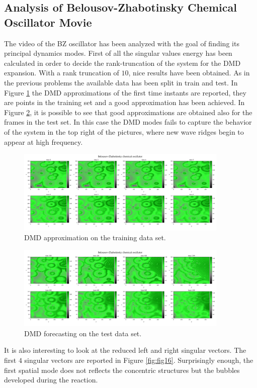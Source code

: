 \documentclass[]{article}
\begin{document}
\subsection{Analysis of  Belousov-Zhabotinsky Chemical Oscillator Movie}
The video of the BZ oscillator has been analyzed with the goal of finding its principal dynamics modes. First of all the singular values energy has been calculated in order to decide the rank-truncation of the system for the DMD expansion. With a rank truncation of $10$, nice results have been obtained. As in the previous problems the available data has been split in train and test. In Figure \ref{fig:fig14} the DMD approximations of the first time instants are reported, they are points in the training set and a good approximation has been achieved. In Figure \ref{fig:fig15}, it is possible to see that good approximations are obtained also for the frames in the test set. In this case the DMD modes fails to capture the behavior of the system in the top right of the pictures, where new wave ridges begin to appear at high frequency.
\begin{figure}[h]
	\centering
	\includegraphics[width=0.9\textwidth]{../figures/BZ_closetime.png}
	\caption{DMD approximation on the training data set.}
	\label{fig:fig14}
\end{figure}
\begin{figure}[h]
	\centering
	\includegraphics[width=0.9\textwidth]{../figures/BZ_fartime.png}
	\caption{DMD forecasting on the test data set.}
	\label{fig:fig15}
\end{figure}
It is also interesting to look at the reduced left and right singular vectors. The first $4$ singular vectors are reported in Figure \ref{fig:fig16}. Surprisingly enough, the first spatial mode does not reflects the concentric structures but the bubbles developed during the reaction.
\end{document}

